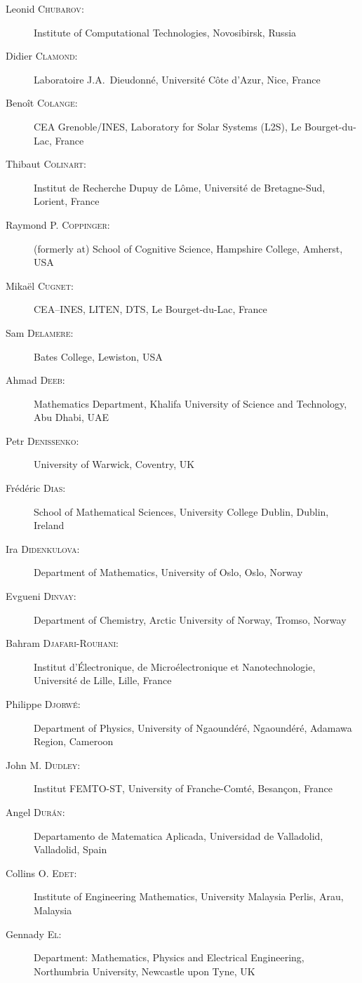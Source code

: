 \begin{description}
  \item[Leonid \textsc{Chubarov}:] Institute of Computational Technologies, Novosibirsk, Russia
  \item[Didier \textsc{Clamond}:] Laboratoire J.A.~Dieudonn\'e, Universit\'e C\^ote d'Azur, Nice, France
  \item[Beno\^it \textsc{Colange}:] CEA Grenoble/INES, Laboratory for Solar Systems (L2S), Le Bourget-du-Lac, France
  \item[Thibaut \textsc{Colinart}:] Institut de Recherche Dupuy de L\^ome, Universit\'e de Bretagne-Sud, Lorient, France
  \item[Raymond P. \textsc{Coppinger}:] (formerly at) School of Cognitive Science, Hampshire College, Amherst, USA
  \item[Mika\"el \textsc{Cugnet}:] CEA--INES, LITEN, DTS, Le Bourget-du-Lac, France
  \item[Sam \textsc{Delamere}:] Bates College, Lewiston, USA
  \item[Ahmad \textsc{Deeb}:] Mathematics Department, Khalifa University of Science and Technology, Abu Dhabi, UAE
  \item[Petr \textsc{Denissenko}:] University of Warwick, Coventry, UK
  \item[Fr\'ed\'eric \textsc{Dias}:] School of Mathematical Sciences, University College Dublin, Dublin, Ireland
  \item[Ira \textsc{Didenkulova}:] Department of Mathematics, University of Oslo, Oslo, Norway
  \item[Evgueni \textsc{Dinvay}:] Department of Chemistry, Arctic University of Norway, Tromso, Norway
  \item[Bahram \textsc{Djafari-Rouhani}:] Institut d'\'Electronique, de Micro\'electronique et Nanotechnologie, Universit\'e de Lille, Lille, France
  \item[Philippe \textsc{Djorw\'e}:] Department of Physics, University of Ngaound\'er\'e, Ngaoundéré, Adamawa Region, Cameroon
  \item[John M. \textsc{Dudley}:] Institut FEMTO-ST, University of Franche-Comt\'e, Besan\c{c}on, France
  \item[Angel \textsc{Dur\'an}:] Departamento de Matematica Aplicada, Universidad de Valladolid, Valladolid, Spain
  \item[Collins O. \textsc{Edet}:] Institute of Engineering Mathematics, University Malaysia Perlis, Arau, Malaysia
  \item[Gennady \textsc{El}:] Department: Mathematics, Physics and Electrical Engineering, Northumbria University, Newcastle upon Tyne, UK

\end{description}
